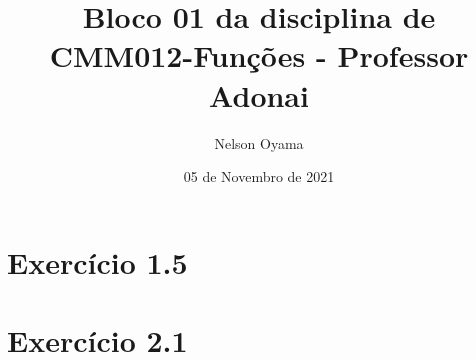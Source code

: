 \documentclass[a4paper]{article}
\author{Nelson Oyama}
\title{Bloco 01 da disciplina de CMM012-Funções - Professor Adonai}
\date{05 de Novembro de 2021}
\begin{document}
	\maketitle
	\section{Exercício 1.5}
		
	
	\newpage	
	\section{Exercício 2.1}
		
\end{document}
